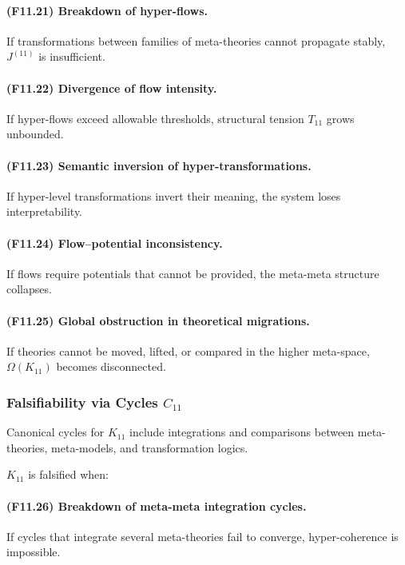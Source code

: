 \paragraph{(F11.21) Breakdown of hyper-flows.}
If transformations between families of meta-theories cannot propagate
stably, $J^{(11)}$ is insufficient.

\paragraph{(F11.22) Divergence of flow intensity.}
If hyper-flows exceed allowable thresholds,
structural tension $T_{11}$ grows unbounded.

\paragraph{(F11.23) Semantic inversion of hyper-transformations.}
If hyper-level transformations invert their meaning,
the system loses interpretability.

\paragraph{(F11.24) Flow–potential inconsistency.}
If flows require potentials that cannot be provided,
the meta-meta structure collapses.

\paragraph{(F11.25) Global obstruction in theoretical migrations.}
If theories cannot be moved, lifted, or compared in the higher meta-space,
$\Omega(K_{11})$ becomes disconnected.



\subsubsection{Falsifiability via Cycles $C_{11}$}

Canonical cycles for $K_{11}$ include integrations and comparisons between
meta-theories, meta-models, and transformation logics.

$K_{11}$ is falsified when:

\paragraph{(F11.26) Breakdown of meta-meta integration cycles.}
If cycles that integrate several meta-theories  
fail to converge, hyper-coherence is impossible.

